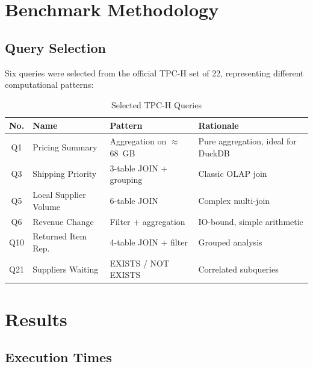 \documentclass[12pt,a4paper]{article}
\begin{document}
\section{Benchmark Methodology}

\subsection{Query Selection}

Six queries were selected from the official TPC-H set of 22, representing different
computational patterns:

\begin{table}[H]
  \centering
  \caption{Selected TPC-H Queries}
  \label{tab:queries}
  \begin{tabular}{clll}
    \toprule
    \textbf{No.} & \textbf{Name} & \textbf{Pattern} & \textbf{Rationale} \\
    \midrule
    Q1  & Pricing Summary       & Aggregation on $\approx$68~GB     & Pure aggregation, ideal for DuckDB \\
    Q3  & Shipping Priority     & 3-table JOIN + grouping           & Classic OLAP join \\
    Q5  & Local Supplier Volume & 6-table JOIN                      & Complex multi-join \\
    Q6  & Revenue Change        & Filter + aggregation              & IO-bound, simple arithmetic \\
    Q10 & Returned Item Rep.    & 4-table JOIN + filter             & Grouped analysis \\
    Q21 & Suppliers Waiting     & EXISTS / NOT EXISTS               & Correlated subqueries \\
    \bottomrule
  \end{tabular}
\end{table}

\section{Results}

\subsection{Execution Times}
\end{document}
